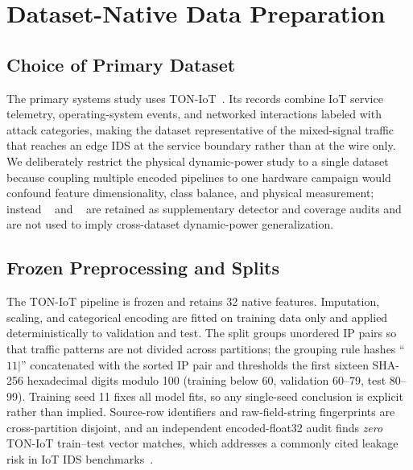 \section{Dataset-Native Data Preparation}
\label{sec:data}
\subsection{Choice of Primary Dataset}
The primary systems study uses TON-IoT~\cite{Moustafa2021TONIoT,TONSource}. Its records combine IoT service telemetry, operating-system events, and networked interactions labeled with attack categories, making the dataset representative of the mixed-signal traffic that reaches an edge IDS at the service boundary rather than at the wire only. We deliberately restrict the physical dynamic-power study to a single dataset because coupling multiple encoded pipelines to one hardware campaign would confound feature dimensionality, class balance, and physical measurement; instead \cic{}~\cite{Neto2023CICIoT2023,CICSource} and \nb{}~\cite{Meidan2018NBaIoT,NBaIoTSource} are retained as supplementary detector and coverage audits and are not used to imply cross-dataset dynamic-power generalization.

\subsection{Frozen Preprocessing and Splits}
The TON-IoT pipeline is frozen and retains 32 native features. Imputation, scaling, and categorical encoding are fitted on training data only and applied deterministically to validation and test. The split groups unordered IP pairs so that traffic patterns are not divided across partitions; the grouping rule hashes ``$11\vert$'' concatenated with the sorted IP pair and thresholds the first sixteen SHA-256 hexadecimal digits modulo 100 (training below 60, validation 60--79, test 80--99). Training seed 11 fixes all model fits, so any single-seed conclusion is explicit rather than implied. Source-row identifiers and raw-field-string fingerprints are cross-partition disjoint, and an independent encoded-float32 audit finds \emph{zero} TON-IoT train--test vector matches, which addresses a commonly cited leakage risk in IoT IDS benchmarks~\cite{Arp2022}.

